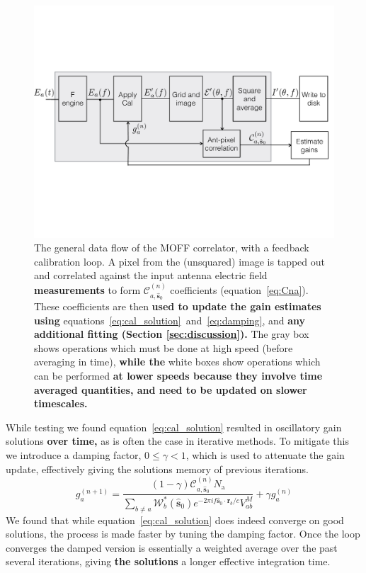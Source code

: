 \documentclass[a4paper,fleqn,usenatbib]{../mnras}
\newcommand{\Nant}{\ensuremath{N_{\mathrm{a}}}}
\newcommand{\spix}{\ensuremath{\hat{\mathbf{s}}_{0}}}
\newcommand{\Cna}[1][n]{\ensuremath{\mathcal{C}^{(#1)}_{a,\spix}}}
\newcommand{\rb}{\ensuremath{\mathbf{r}_b}}
\newcommand{\damp}{\ensuremath{\gamma}}
\begin{document}
\begin{figure}
\begin{center}
\includegraphics[width=\columnwidth]{fig2.pdf}
\caption{The general data flow of the MOFF correlator, with a feedback calibration loop. A pixel 
from the (unsquared) image is tapped out and correlated against the input antenna electric field 
\textbf{measurements} to form $\Cna$ coefficients (equation~\ref{eq:Cna}). These coefficients are then 
\textbf{used to update the gain estimates using} equations~\ref{eq:cal_solution}~and~\ref{eq:damping},
and \textbf{any additional fitting (Section \ref{sec:discussion}).}
The gray box shows operations which must be done at high speed (before averaging in time),
\textbf{while the} white boxes show operations which can be performed \textbf{at lower speeds because
they involve time averaged quantities, and need to be updated on slower timescales.}
}
\label{fig:schematic}
\end{center}
\end{figure}

While testing we found equation~\ref{eq:cal_solution} resulted in oscillatory gain solutions \textbf{over time,} 
as is often the case in iterative methods. To mitigate this we 
introduce a damping factor, $0 \leq \damp <1$, which is used to attenuate the gain update, 
effectively giving the solutions memory of previous iterations.
\begin{equation}\label{eq:damping}
g^{(n+1)}_a = \frac{(1-\damp)\Cna \Nant }{ \sum_{b\ne a} \mathcal{W}^*_b(\spix) e^{-2\pi i f\spix \cdot \rb/c} V^M_{ab} }+ \damp g^{(n)}_a
\end{equation}
We found that while equation~\ref{eq:cal_solution} does indeed converge on good solutions, 
the process is made faster by tuning the damping factor. 
 Once the loop converges the damped version is 
essentially a weighted average over the past several iterations, giving \textbf{the solutions} a longer effective 
integration time. 
\end{document}
